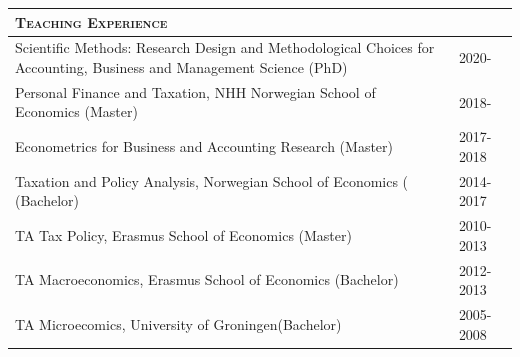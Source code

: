 \documentclass [11pt]{article}
\newcommand{\kiss}
{\vspace{0.5cm}}
\newcommand{\first} 
{13.8}
\newcommand{\second}
{2.5}
\newcommand{\thickrule}{\toprule}
\newcommand{\ttitle}[1]{\scshape{\Large {#1}}}
\begin{document}

\kiss



\begin{tabular}[t] {p{\first cm} p{\second cm} }
\multicolumn{2}{l}{
\ttitle{Teaching Experience}} %
\\
\thickrule
Scientific Methods: Research Design and Methodological Choices for Accounting, Business and Management Science (PhD) & 2020-\\
Personal Finance and Taxation, NHH Norwegian School of Economics (Master) & 2018-\\
Econometrics for Business and Accounting Research  (Master) & 2017-2018\\
Taxation and Policy Analysis, Norwegian School of Economics ( (Bachelor)& 2014-2017\\
TA Tax Policy, Erasmus School of Economics (Master) & 2010-2013 	\\
TA Macroeconomics, Erasmus School of Economics (Bachelor) & 2012-2013	\\
TA Microecomics, University of Groningen(Bachelor)  & 2005-2008 \\
\end{tabular}
\end{document}
